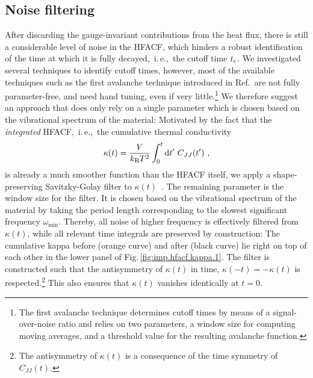 \subsection{Noise filtering}
After discarding the gauge-invariant contributions from the heat flux, there is still a considerable level of noise in the HFACF, which hinders a robust identification of the time at which it is fully decayed,~i.\,e.,~the cutoff time $t_{\rm c}$. We investigated several techniques to identify cutoff times, however, most of the available techniques such as the first avalanche technique introduced in Ref.\,\cite{Chen2010} are not fully parameter-free, and need hand tuning, even if very little.\footnote{The first avalanche technique determines cutoff times by means of a signal-over-noise ratio and relies on two parameters, a window size for computing moving averages, and a threshold value for the resulting avalanche function.} We therefore suggest an approach that does only rely on a single parameter which is chosen based on the vibrational spectrum of the material: Motivated by the fact that the \emph{integrated} HFACF,~i.\,e.,~the cumulative thermal conductivity
\begin{align}
	\kappa (t)
		=
		\frac{V}{k_{\rm B} T^2} 
		\int_{0}^{t} 
		\d t' ~ C_{JJ} (t')~,
	\label{eq:imp.kappa.cum}
\end{align}
is already a much smoother function than the HFACF itself, we apply a shape-preserving Savitzky-Golay filter to $\kappa (t)$~\cite{Savitzky1964}. The remaining parameter is the window size for the filter. It is chosen based on the vibrational spectrum of the material by taking the period length corresponding to the slowest significant frequency $\omega_{\min}$. Thereby, all noise of higher frequency is effectively filtered from $\kappa (t)$, while all relevant time integrals are preserved by construction: The cumulative kappa before (orange curve) and after (black curve) lie right on top of each other in the lower panel of Fig.\,\ref{fig:imp.hfacf.kappa.1}. The filter is constructed such that the antisymmetry of $\kappa (t)$ in time, $\kappa (-t) = - \kappa (t)$ is respected.\footnote{The antisymmetry of $\kappa (t)$ is a consequence of the time symmetry of $C_{JJ} (t)$.} This also ensures that $\kappa (t)$ vanishes identically at $t=0$.

